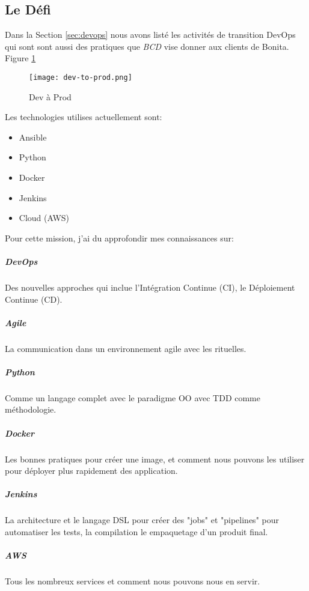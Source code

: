 \subsection{Le Défi}
Dans la Section \ref{sec:devops} nous avons listé les activités de transition DevOps qui sont sont aussi des pratiques que \emph{BCD} vise donner aux clients de Bonita. Figure \ref{fig:dev-to-prod}

\begin{figure}[!ht]
\centering
\texttt{[image: dev-to-prod.png]}
\caption{Dev à Prod}
\label{fig:dev-to-prod}
\end{figure}

Les technologies utilises actuellement sont:
\begin{itemize}
  \item Ansible
  \item Python
  \item Docker
  \item Jenkins
  \item Cloud (AWS)
\end{itemize}

Pour cette mission, j'ai du approfondir mes connaissances sur:
\subparagraph{DevOps} Des nouvelles approches qui inclue l'Intégration Continue (CI), le Déploiement Continue (CD).
\subparagraph{Agile} La communication dans un environnement agile avec les rituelles.
\subparagraph{Python} Comme un langage complet avec le paradigme OO avec TDD comme méthodologie.
\subparagraph{Docker} Les bonnes pratiques pour créer une image, et comment nous pouvons les utiliser pour déployer plus rapidement des application.
\subparagraph{Jenkins} La architecture et le langage DSL pour  créer des "jobs" et "pipelines" pour automatiser les tests, la compilation le empaquetage d'un produit final.
\subparagraph{AWS} Tous les nombreux services et comment nous pouvons nous en servir.

